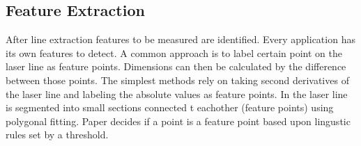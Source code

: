 \subsection*{Feature Extraction}
After line extraction features to be measured are identified. Every application has its own features to detect. A common approach is to label certain point on the laser line as feature points. Dimensions can then be calculated by the difference between those points. The simplest methods \cite{li2010measurement} \cite{huang2012development} rely on taking second derivatives of the laser line and labeling the absolute values as feature points. In \cite{kim1995robust} the laser line is segmented into small sections connected t eachother (feature points) using polygonal fitting. Paper \cite{davis2011vision} decides if a point is a feature point based upon lingustic rules set by a threshold. 

